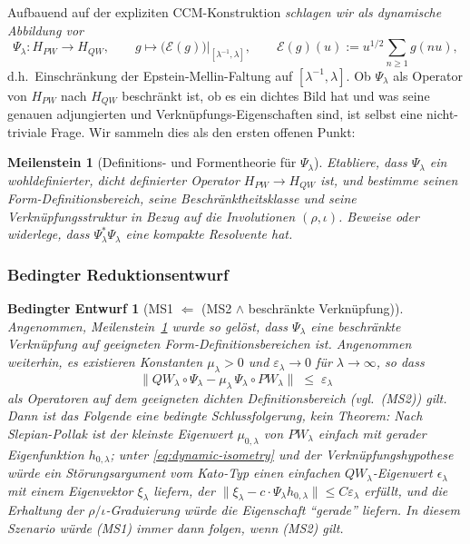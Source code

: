 \documentclass[11pt,a4paper]{article}
\theoremstyle{plain}
\newtheorem{blueprint}[theorem]{Bedingter Entwurf}
\newtheorem{milestone}[theorem]{Meilenstein}
\theoremstyle{definition}
\begin{document}
Aufbauend auf der expliziten CCM-Konstruktion \emph{schlagen wir als
dynamische Abbildung vor}
\[
  \Psi_\lambda : H_{PW} \longrightarrow H_{QW}, \qquad
    g \mapsto \big(\mathcal E(g)\big)\big|_{[\lambda^{-1},\lambda]},
  \qquad \mathcal E(g)(u) := u^{1/2} \sum_{n \ge 1} g(nu),
\]
d.h.\ Einschränkung der Epstein-Mellin-Faltung auf $[\lambda^{-1},\lambda]$.
Ob $\Psi_\lambda$ als Operator von $H_{PW}$ nach $H_{QW}$ beschränkt ist,
ob es ein dichtes Bild hat und was seine genauen adjungierten und
Verknüpfungs-Eigenschaften sind, ist selbst eine nicht-triviale Frage.
Wir sammeln dies als den ersten offenen Punkt:

\begin{milestone}[Definitions- und Formentheorie für $\Psi_\lambda$]
\label{ms:psi-domain}
Etabliere, dass $\Psi_\lambda$ ein wohldefinierter, dicht definierter
Operator $H_{PW} \to H_{QW}$ ist, und bestimme seinen Form-Definitionsbereich,
seine Beschränktheitsklasse und seine Verknüpfungsstruktur in Bezug auf
die Involutionen $(\rho, \iota)$. Beweise oder widerlege, dass
$\Psi_\lambda^\ast \Psi_\lambda$ eine kompakte Resolvente hat.
\end{milestone}

\subsubsection{Bedingter Reduktionsentwurf}

\begin{blueprint}[MS1 $\Leftarrow$ (MS2 $\wedge$ beschränkte Verknüpfung)]
\label{bp:fst-transfer}
Angenommen, Meilenstein~\ref{ms:psi-domain} wurde so gelöst, dass $\Psi_\lambda$
eine beschränkte Verknüpfung auf geeigneten Form-Definitionsbereichen ist.
Angenommen weiterhin, es existieren Konstanten $\mu_\lambda > 0$
und $\varepsilon_\lambda \to 0$ für $\lambda \to \infty$, so dass
\begin{equation}\label{eq:dynamic-isometry}
  \big\| QW_\lambda \circ \Psi_\lambda
    - \mu_\lambda \, \Psi_\lambda \circ PW_\lambda \big\|
  \;\le\; \varepsilon_\lambda
\end{equation}
als Operatoren auf dem geeigneten dichten Definitionsbereich (vgl.~(MS2)) gilt.
Dann ist das Folgende eine bedingte Schlussfolgerung, kein Theorem:
Nach Slepian-Pollak \cite{SlepianPollack1961} ist der kleinste Eigenwert
$\mu_{0,\lambda}$ von $PW_\lambda$ einfach mit gerader Eigenfunktion
$h_{0,\lambda}$; unter \eqref{eq:dynamic-isometry} und der
Verknüpfungshypothese würde ein Störungsargument vom Kato-Typ \cite{Kato}
einen einfachen $QW_\lambda$-Eigenwert $\epsilon_\lambda$ mit einem Eigenvektor
$\xi_\lambda$ liefern, der $\|\xi_\lambda - c \cdot \Psi_\lambda h_{0,\lambda}\| \le
C \varepsilon_\lambda$ erfüllt, und die Erhaltung der $\rho/\iota$-Graduierung würde
die Eigenschaft ``gerade'' liefern. In diesem Szenario würde (MS1) immer dann
folgen, wenn (MS2) gilt.
\end{blueprint}
\end{document}
